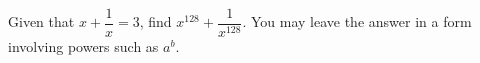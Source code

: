 Given that $x+\dfrac1x=3$, find $x^{128}+\dfrac{1}{x^{128}}$. You may leave the answer in a form involving powers such as $a^b$.
